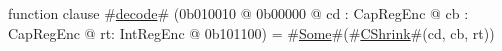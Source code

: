 function clause #\hyperref[zdecode]{decode}# (0b010010 @ 0b00000 @ cd : CapRegEnc @ cb : CapRegEnc @ rt: IntRegEnc  @ 0b101100) = #\hyperref[zSome]{Some}#(#\hyperref[zCShrink]{CShrink}#(cd, cb, rt))
